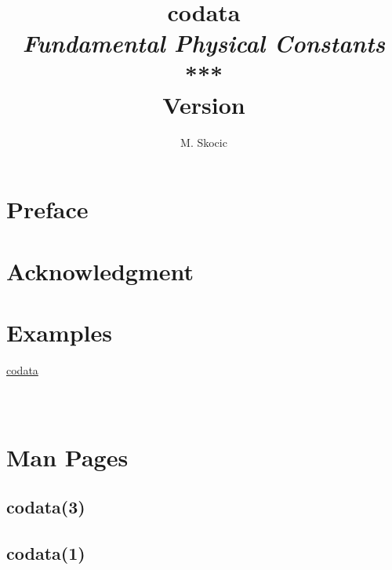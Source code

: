 \documentclass[11pt,a4paper,twoside,openright]{book}
\title{{\Huge codata} \\
{\it Fundamental Physical Constants}\\
***\\
Version \FPMVERSION}
\author{M. Skocic}
\begin{document}
\maketitle

\frontmatter
\pagestyle{plain}
\tableofcontents
\listoffigures
\listoftables
\chapter{Preface}
\chapter{Acknowledgment}



\mainmatter
\pagestyle{fancy}
\chapter{Examples}
\href{./latex/codata-refman.pdf}{codata} 
\lipsum[0-6]

\inputminted{Fortran}{../../example/example.f90}
\inputminted{c}{../../example/example.c}
\inputminted{python}{../../example/example.py}
\chapter{Man Pages}
\section{codata(3)}
\fvset{}

\section{codata(1)}
\fvset{}
    


\backmatter
\pagestyle{plain}
\nocite{*}
\printbibliography[heading=bibintoc]
\printindex
\end{document}

